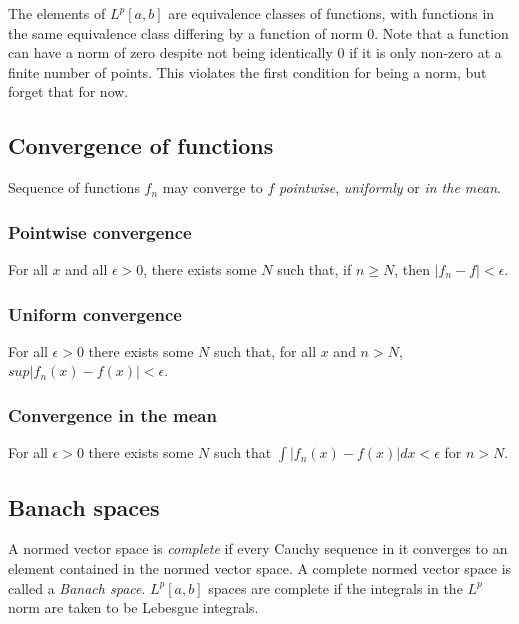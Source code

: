 \documentclass[]{article}
\begin{document}
The elements of $L^{p}[a,b]$ are equivalence classes of functions, with functions in the same equivalence class differing by a function of norm $0$. Note that a function can have a norm of zero despite not being identically 0 if it is only non-zero at a finite number of points. This violates the first condition for being a norm, but forget that for now.

\subsection{Convergence of functions}
Sequence of functions $f_{n}$ may converge to $f$ \textit{pointwise}, \textit{uniformly} or \textit{in the mean}.
\subsubsection{Pointwise convergence}
For all $x$ and all $\epsilon > 0$, there exists some $N$ such that, if $n \geq N$, then $|f_{n} - f| < \epsilon$. 
\subsubsection{Uniform convergence}
For all $\epsilon > 0$ there exists some $N$ such that, for all $x$ and $n > N$, $sup|f_{n}(x) - f(x)| < \epsilon$.
\subsubsection{Convergence in the mean}
For all $\epsilon > 0$ there exists some $N$ such that $\int |f_{n}(x) - f(x)|dx < \epsilon$ for $n > N$.

\subsection{Banach spaces}
A normed vector space is \textit{complete} if every Cauchy sequence in it converges to an element contained in the normed vector space. A complete normed vector space is called a \textit{Banach space}. $L^{p}[a,b]$ spaces are complete if the integrals in the $L^{p}$ norm are taken to be Lebesgue integrals.
\end{document}
